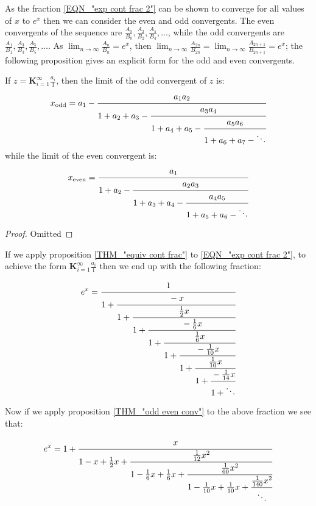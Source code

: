 As the fraction \ref{EQN_"exp cont frac 2"} can be shown to converge for all values of \(x\) to \(e^x\) then we can consider the even and odd convergents. The even convergents of the sequence are \(\frac{A_0}{B_0}, \frac{A_2}{B_2}, \frac{A_4}{B_4}, \ldots\), while the odd convergents are \(\frac{A_1}{B_1}, \frac{A_3}{B_3}, \frac{A_5}{B_5}, \ldots\). As \(\lim_{n\to\infty} \frac{A_n}{B_n}=e^x\), then \(\lim_{n\to\infty}\frac{A_{2n}}{B_{2n}} = \lim_{n\to\infty}\frac{A_{2n+1}}{B_{2n+1}} = e^x\); the following proposition gives an explicit form for the odd and even convergents.

\begin{odd even conv}
\label{THM_"odd even conv"}
If \(z = \mathbf{K}_{i=1}^\infty \frac{a_i}{1}\), then the limit of the odd convergent of \(z\) is:
\begin{displaymath}
	x_{\textrm{odd}}=a_1 - \cfrac{a_1a_2}{1+a_2+a_3 -
						   \cfrac{a_3a_4}{1+a_4+a_5 -
						   \cfrac{a_5a_6}{1+a_6+a_7 - \ddots} } }
\end{displaymath}
while the limit of the even convergent is:
\begin{displaymath}
	x_{\textrm{even}}=\cfrac{a_1}{1+a_2 -
					  \cfrac{a_2a_3}{1+a_3+a_4 -
					  \cfrac{a_4a_5}{1+a_5+a_6 - \ddots} } }
\end{displaymath}
\end{odd even conv}
\begin{proof}
Omitted
\end{proof}

If we apply proposition \ref{THM_"equiv cont frac"} to \ref{EQN_"exp cont frac 2"}, to achieve the form \(\mathbf{K}_{i=1}^\infty \frac{a_i}{1}\) then we end up with the following fraction:

\begin{equation}
	e^x = \cfrac{1}{1 +
		  \cfrac{-x}{1 +
		  \cfrac{\frac{1}{2}x}{1 +
		  \cfrac{-\frac{1}{6}x}{1 +
		  \cfrac{\frac{1}{6}x}{1 +
		  \cfrac{-\frac{1}{10}x}{1 +
		  \cfrac{\frac{1}{10}x}{1 + 
		  \cfrac{-\frac{1}{14}x}{1 + \ddots} } } } } } } }
\end{equation}

Now if we apply proposition \ref{THM_"odd even conv"} to the above fraction we see that:

\begin{equation}
	e^x = 1 + \cfrac{x}{1 - x + \frac{1}{2}x +
			  \cfrac{\frac{1}{12}x^2}{1 - \frac{1}{6}x + \frac{1}{6}x +
			  \cfrac{\frac{1}{60}x^2}{1 -\frac{1}{10}x +\frac{1}{10}x +
			  \cfrac{\frac{1}{140}x^2}{\ddots} } } }
\end{equation}

